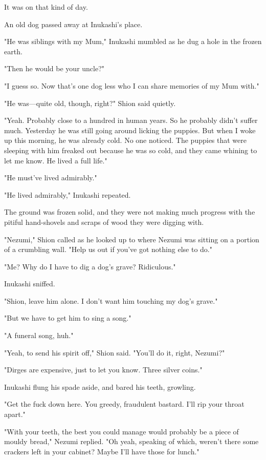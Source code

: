 It was on that kind of day.

An old dog passed away at Inukashi's place.

"He was siblings with my Mum," Inukashi mumbled as he dug a hole in the
frozen earth.

"Then he would be your uncle?"

"I guess so. Now that's one dog less who I can share memories of my Mum
with."

"He was---quite old, though, right?" Shion said quietly.

"Yeah. Probably close to a hundred in human years. So he probably didn't
suffer much. Yesterday he was still going around licking the puppies.
But when I woke up this morning, he was already cold. No one noticed.
The puppies that were sleeping with him freaked out because he was so
cold, and they came whining to let me know. He lived a full life."

"He must've lived admirably."

"He lived admirably," Inukashi repeated.

The ground was frozen solid, and they were not making much progress with
the pitiful hand-shovels and scraps of wood they were digging with.

"Nezumi," Shion called as he looked up to where Nezumi was sitting on a
portion of a crumbling wall. "Help us out if you've got nothing else to
do."

"Me? Why do I have to dig a dog's grave? Ridiculous."

Inukashi sniffed.

"Shion, leave him alone. I don't want him touching my dog's grave."

"But we have to get him to sing a song."

"A funeral song, huh."

"Yeah, to send his spirit off," Shion said. "You'll do it, right,
Nezumi?"

"Dirges are expensive, just to let you know. Three silver coins."

Inukashi flung his spade aside, and bared his teeth, growling.

"Get the fuck down here. You greedy, fraudulent bastard. I'll rip your
throat apart."

"With your teeth, the best you could manage would probably be a piece of
mouldy bread," Nezumi replied. "Oh yeah, speaking of which, weren't
there some crackers left in your cabinet? Maybe I'll have those for
lunch."

